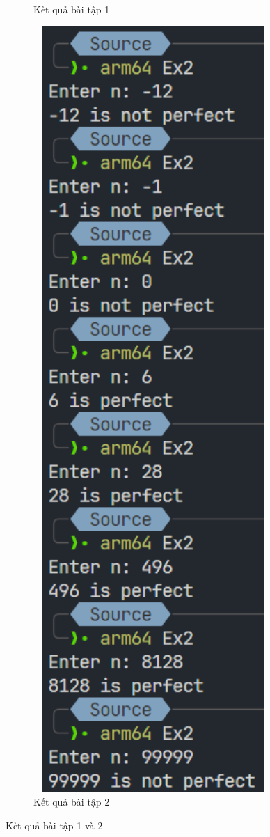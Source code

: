 \documentclass[a4paper,12pt]{report}
\begin{document}
\begin{figure}[!ht]
\begin{subfigure}{0.28\textwidth}
		\caption{Kết quả bài tập 1}
	\end{subfigure}
	\hfill
	\begin{subfigure}{0.37\textwidth}
		\centering
		\includegraphics[width=1\textwidth]{imgs/2.png}
		\caption{Kết quả bài tập 2}
	\end{subfigure}
	\caption{Kết quả bài tập 1 và 2}
\end{figure}
\end{document}
